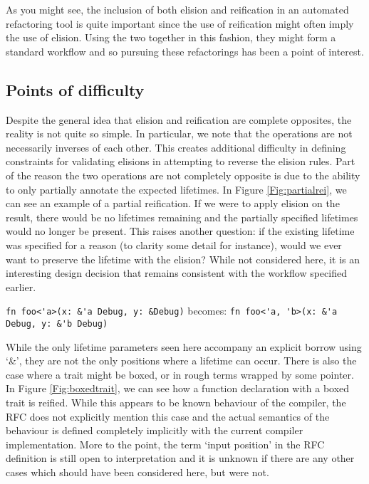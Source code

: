 As you might see, the inclusion of both elision and reification in an automated refactoring tool is quite important since the use of reification might often imply the use of elision. Using the two together in this fashion, they might form a standard workflow and so pursuing these refactorings has been a point of interest.

\subsection{Points of difficulty}\label{S:pod}
Despite the general idea that elision and reification are complete opposites, the reality is not quite so simple. In particular, we note that the operations are not necessarily inverses of each other. This creates additional difficulty in defining constraints for validating elisions in attempting to reverse the elision rules. Part of the reason the two operations are not completely opposite is due to the ability to only partially annotate the expected lifetimes. In Figure \ref{Fig:partialrei}, we can see an example of a partial reification. If we were to apply elision on the result, there would be no lifetimes remaining and the partially specified lifetimes would no longer be present. This raises another question: if the existing lifetime was specified for a reason (to clarity some detail for instance), would we ever want to preserve the lifetime with the elision? While not considered here, it is an interesting design decision that remains consistent with the workflow specified earlier. 

\begin{fig}
{\verb|fn foo<'a>(x: &'a Debug, y: &Debug)|}\newline
becomes: {\verb|fn foo<'a, 'b>(x: &'a Debug, y: &'b Debug)|}
\caption{Partial reification -- \emph{'a} exists, \emph{'b} missing}
\label{Fig:partialrei}
\end{fig}


While the only lifetime parameters seen here accompany an explicit borrow using `\&', they are not the only positions where a lifetime can occur. There is also the case where a trait might be boxed, or in rough terms wrapped by some pointer. In Figure \ref{Fig:boxedtrait}, we can see how a function declaration with a boxed trait is reified. While this appears to be known behaviour of the compiler, the RFC does not explicitly mention this case and the actual semantics of the behaviour is defined completely implicitly with the current compiler implementation. More to the point, the term `input position' in the RFC definition is still open to interpretation and it is unknown if there are any other cases which should have been considered here, but were not.


